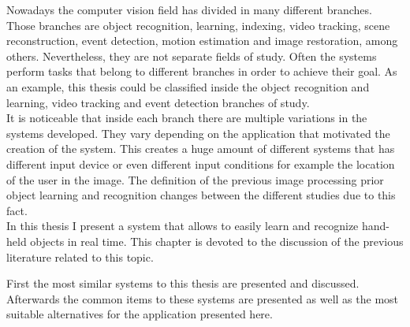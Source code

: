 Nowadays the computer vision field has divided in many different branches. 
Those branches are object recognition, learning, indexing, video tracking, scene reconstruction, event detection, motion estimation and image restoration, among others. 
Nevertheless, they are not separate fields of study. 
Often the systems perform tasks that belong to different branches in order to achieve their goal. 
As an example, this thesis could be classified inside the object recognition and learning, video tracking and event detection branches of study. 
\\

It is noticeable that inside each branch there are multiple variations in the systems developed. 
They vary depending on the application that motivated the creation of the system. 
This creates a huge amount of different systems that has different input device or even different input conditions for example the location of the user in the image. 
The definition of the previous image processing prior object learning and recognition changes between the different studies due to this fact.
\\


In this thesis I present a system that allows to easily learn and recognize hand-held objects in real time. 
This chapter is devoted to the discussion of the previous literature related to this topic. 

First the most similar systems to this thesis are presented and discussed. 
Afterwards the common items to these systems are presented as well as the most suitable alternatives for the application presented here. 



